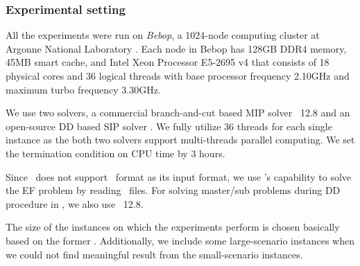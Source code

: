 \subsubsection{Experimental setting}
All the experiments were run on \textit{Bebop}, a 1024-node computing cluster at Argonne National Laboratory \cite{bebop}. Each node in Bebop has 128GB DDR4 memory, 45MB smart cache, and Intel Xeon Processor E5-2695 v4 that consists of 18 physical cores and 36 logical threads with base processor frequency 2.10GHz and maximum turbo frequency 3.30GHz. 

We use two solvers, a commercial branch-and-cut based MIP solver \cplex\ 12.8 and an open-source DD based SIP solver \dsp. We fully utilize 36 threads for each single instance as the both two solvers support multi-threads parallel computing. We set the termination condition on CPU time by 3 hours. 

Since \cplex\ does not support \smps\ format as its input format, we use \dsp's capability to solve the EF problem by reading \smps\ files. For solving master/sub problems during DD procedure in \dsp, we also use \cplex\ 12.8. 

The size of the instances on which the experiments perform is chosen basically based on the former \siplib. Additionally, we include some large-scenario instances when we could not find meaningful result from the small-scenario instances.


